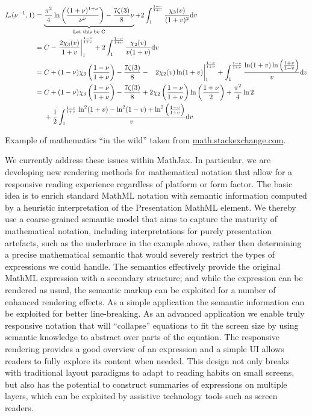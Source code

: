 \documentclass{llncs}
\begin{document}
\begin{table}
  \vspace{-20pt}
  \centering
  \begin{align*}
I_\nu(\nu^{-1},1)
&=\underbrace{\frac{\pi^2}{4}\ln\left(\frac{(1+\nu)^{1+\nu}}{\nu^\nu}
\right)-\frac{7\zeta(3)}{8}\nu}_{\text{Let this be 
C}}+2\int^\frac{1-\nu}{1+\nu}_1\frac{\chi_3(v)}{(1+v)^2}{\rm d}v\\
&=C-\left.\frac{2\chi_3(v)}{1+v}\right|^\frac{1-\nu}{1+\nu}_1+2\int^\frac{1-\nu}
{1+\nu}_1\frac{\chi_2(v)}{v(1+v)}{\rm d}v\\
&=C+(1-\nu)\chi_3\left(\frac{1-\nu}{1+\nu}\right)-\frac{7\zeta(3)}{8}
-\left.{\color{white}{\frac{1}{1}}}2\chi_2(v)\ln(1+v)\right|^\frac{1-\nu}{1+\nu}
_1+\int^\frac{1-\nu}{1+\nu}_1\frac{\ln(1+v)\ln\left(\frac{1+v}{1-v}\right)}{v}{
\rm d}v\\
&=C+(1-\nu)\chi_3\left(\frac{1-\nu}{1+\nu}\right)-\frac{7\zeta(3)}{8}
+2\chi_2\left(\frac{1-\nu}{1+\nu}\right)\ln\left(\frac{1+\nu}{2}\right)+\frac{
\pi^2}{4}\ln{2}\\
&\ \ \ \ 
+\frac{1}{2}\int^\frac{1-\nu}{1+\nu}_1\frac{
\ln^2(1+v)-\ln^2(1-v)+\ln^2\left(\frac{1-v}{1+v}\right)}{v}{\rm d}v
\end{align*}
\caption{Example of mathematics ``in the wild'' taken from \href{http://math.stackexchange.com/a/1285149}{math.stackexchange.com}.}
\label{tab:example_eq}
  \vspace{-20pt}
\end{table}

We currently address these issues within MathJax. In particular, we are
developing new rendering methods for mathematical notation that allow for a
responsive reading experience regardless of platform or form factor. The basic
idea is to enrich standard MathML notation with semantic information computed by
a heuristic interpretation of the Presentation MathML element. We thereby use a
coarse-grained semantic model that aims to capture the maturity of mathematical
notation, including interpretations for purely presentation artefacts, such as
the underbrace in the example above, rather then determining a precise
mathematical semantic that would severely restrict the types of expressions we
could handle. The semantics effectively provide the original MathML expression
with a secondary structure; and while the expression can be rendered as usual,
the semantic markup can be exploited for a number of enhanced rendering
effects. As a simple application the semantic information can be exploited for
better line-breaking. As an advanced application we enable truly responsive
notation that will “collapse” equations to fit the screen size by using semantic
knowledge to abstract over parts of the equation.  The responsive rendering
provides a good overview of an expression and a simple UI allows readers to
fully explore its content when needed.  This design not only breaks with
traditional layout paradigms to adapt to reading habits on small screens, but
also has the potential to construct summaries of expressions on multiple layers,
which can be exploited by assistive technology tools such as screen readers.
\end{document}
